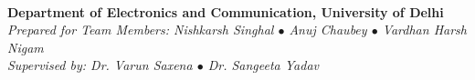 \documentclass[11pt,a4paper]{article}
\begin{document}
\vspace{0.2in}
\begin{center}
    \noindent\makebox[\linewidth]{\color{BorderGray}\rule{\textwidth}{1.2pt}}\\[0.2cm]
    \textbf{\textcolor{DUPurple}{Department of Electronics and Communication, University of Delhi}}\\[0.1cm]
    \textit{Prepared for Team Members: Nishkarsh Singhal $\bullet$ Anuj Chaubey $\bullet$ Vardhan Harsh Nigam}\\[0.1cm]
    \textit{Supervised by: Dr. Varun Saxena $\bullet$ Dr. Sangeeta Yadav}
\end{center}
\end{document}
